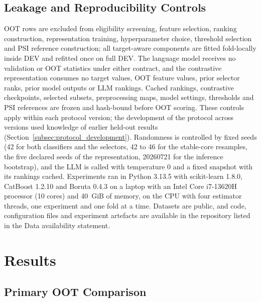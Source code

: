\documentclass[final,5p,twocolumn]{elsarticle}
\begin{document}
\subsection{Leakage and Reproducibility Controls}
\label{subsec:leakage_controls}

OOT rows are excluded from eligibility screening, feature selection, ranking construction, representation training, hyperparameter choice, threshold selection and PSI reference construction; all target-aware components are fitted fold-locally inside DEV and refitted once on full DEV. The language model receives no validation or OOT statistics under either contract, and the contrastive representation consumes no target values, OOT feature values, prior selector ranks, prior model outputs or LLM rankings. Cached rankings, contrastive checkpoints, selected subsets, preprocessing maps, model settings, thresholds and PSI references are frozen and hash-bound before OOT scoring. These controls apply within each protocol version; the development of the protocol across versions used knowledge of earlier held-out results (Section~\ref{subsec:protocol_development}). Randomness is controlled by fixed seeds (42 for both classifiers and the selectors, 42 to 46 for the stable-core resamples, the five declared seeds of the representation, 20260721 for the inference bootstrap), and the LLM is called with temperature 0 and a fixed snapshot with its rankings cached. Experiments ran in Python 3.13.5 with scikit-learn 1.8.0, CatBoost 1.2.10 and Boruta 0.4.3 on a laptop with an Intel Core i7-13620H processor (10 cores) and 40~GiB of memory, on the CPU with four estimator threads, one experiment and one fold at a time. Datasets are public, and code, configuration files and experiment artefacts are available in the repository listed in the Data availability statement.


\section{Results}
\label{sec:results}

\subsection{Primary OOT Comparison}
\label{subsec:primary_results}
\end{document}
